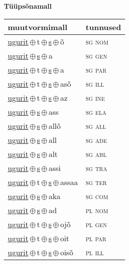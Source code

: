 

\vspace{3.5em}
\noindent \begin{minipage}{\textwidth}
\noindent \textbf{Tüüpsõnamall \,}\\

\begin{sideways}
\begin{tabular}{l l}
muutvormimall & tunnused \\
\hline
\underline{ugurit}\,$\oplus$\,t\,$\oplus$\,\underline{s}\,$\oplus$\,õ & \textsc{ sg nom } \\
\underline{ugurit}\,$\oplus$\,\underline{s}\,$\oplus$\,a & \textsc{ sg gen } \\
\underline{ugurit}\,$\oplus$\,t\,$\oplus$\,\underline{s}\,$\oplus$\,a & \textsc{ sg par } \\
\underline{ugurit}\,$\oplus$\,t\,$\oplus$\,\underline{s}\,$\oplus$\,asõ & \textsc{ sg ill } \\
\underline{ugurit}\,$\oplus$\,t\,$\oplus$\,\underline{s}\,$\oplus$\,az & \textsc{ sg ine } \\
\underline{ugurit}\,$\oplus$\,\underline{s}\,$\oplus$\,ass & \textsc{ sg ela } \\
\underline{ugurit}\,$\oplus$\,\underline{s}\,$\oplus$\,allõ & \textsc{ sg all } \\
\underline{ugurit}\,$\oplus$\,\underline{s}\,$\oplus$\,all & \textsc{ sg ade } \\
\underline{ugurit}\,$\oplus$\,\underline{s}\,$\oplus$\,alt & \textsc{ sg abl } \\
\underline{ugurit}\,$\oplus$\,\underline{s}\,$\oplus$\,assi & \textsc{ sg tra } \\
\underline{ugurit}\,$\oplus$\,t\,$\oplus$\,\underline{s}\,$\oplus$\,assaa & \textsc{ sg ter } \\
\underline{ugurit}\,$\oplus$\,\underline{s}\,$\oplus$\,aka & \textsc{ sg com } \\
\underline{ugurit}\,$\oplus$\,\underline{s}\,$\oplus$\,ad & \textsc{ pl nom } \\
\underline{ugurit}\,$\oplus$\,t\,$\oplus$\,\underline{s}\,$\oplus$\,ojõ & \textsc{ pl gen } \\
\underline{ugurit}\,$\oplus$\,t\,$\oplus$\,\underline{s}\,$\oplus$\,oit & \textsc{ pl par } \\
\underline{ugurit}\,$\oplus$\,t\,$\oplus$\,\underline{s}\,$\oplus$\,oisõ & \textsc{ pl ill } \\

\end{tabular}
\end{sideways}
\end{minipage}
